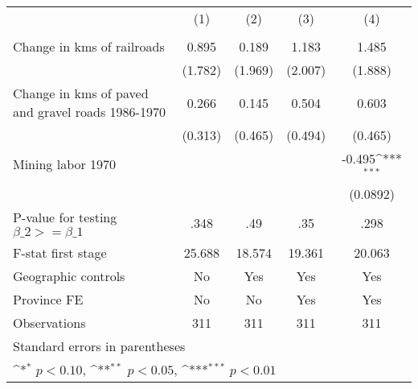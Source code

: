 {
\def\sym#1{\ifmmode^{#1}\else\(^{#1}\)\fi}
\begin{tabular}{l*{4}{c}}
\hline\hline
                &\multicolumn{1}{c}{(1)}&\multicolumn{1}{c}{(2)}&\multicolumn{1}{c}{(3)}&\multicolumn{1}{c}{(4)}\\
                &\multicolumn{1}{c}{}&\multicolumn{1}{c}{}&\multicolumn{1}{c}{}&\multicolumn{1}{c}{}\\
\hline
Change in kms of railroads&    0.895         &    0.189         &    1.183         &    1.485         \\
                &  (1.782)         &  (1.969)         &  (2.007)         &  (1.888)         \\
[1em]
Change in kms of paved and gravel roads 1986-1970&    0.266         &    0.145         &    0.504         &    0.603         \\
                &  (0.313)         &  (0.465)         &  (0.494)         &  (0.465)         \\
[1em]
Mining labor 1970&                  &                  &                  &   -0.495\sym{***}\\
                &                  &                  &                  & (0.0892)         \\
\hline
P-value for testing $\beta\_{2} >= \beta\_{1}$&     .348         &      .49         &      .35         &     .298         \\
F-stat first stage&   25.688         &   18.574         &   19.361         &   20.063         \\
Geographic controls&       No         &      Yes         &      Yes         &      Yes         \\
Province FE     &       No         &       No         &      Yes         &      Yes         \\
Observations    &      311         &      311         &      311         &      311         \\
\hline\hline
\multicolumn{5}{l}{\footnotesize Standard errors in parentheses}\\
\multicolumn{5}{l}{\footnotesize \sym{*} \(p<0.10\), \sym{**} \(p<0.05\), \sym{***} \(p<0.01\)}\\
\end{tabular}
}
